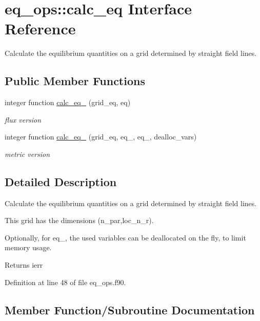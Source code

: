 \hypertarget{interfaceeq__ops_1_1calc__eq}{}\section{eq\+\_\+ops\+:\+:calc\+\_\+eq Interface Reference}
\label{interfaceeq__ops_1_1calc__eq}


Calculate the equilibrium quantities on a grid determined by straight field lines.  


\subsection*{Public Member Functions}
\begin{DoxyCompactItemize}
\item 
integer function \hyperlink{interfaceeq__ops_1_1calc__eq_a8587be1881a2238df0ea9216aaf93555}{calc\+\_\+eq\+\_} (grid\+\_\+eq, eq)
\begin{DoxyCompactList}\small\item\em flux version \end{DoxyCompactList}\item 
integer function \hyperlink{interfaceeq__ops_1_1calc__eq_ae2f56ab19ce5c33e863f32e1c9263604}{calc\+\_\+eq\+\_} (grid\+\_\+eq, eq\+\_, eq\+\_, dealloc\+\_\+vars)
\begin{DoxyCompactList}\small\item\em metric version \end{DoxyCompactList}\end{DoxyCompactItemize}


\subsection{Detailed Description}
Calculate the equilibrium quantities on a grid determined by straight field lines. 

This grid has the dimensions {\ttfamily }(n\+\_\+par,loc\+\_\+n\+\_\+r).

Optionally, for {\ttfamily eq\+\_}, the used variables can be deallocated on the fly, to limit memory usage.

\begin{DoxyReturn}{Returns}
ierr 
\end{DoxyReturn}


Definition at line 48 of file eq\+\_\+ops.\+f90.



\subsection{Member Function/\+Subroutine Documentation}
\mbox{\label{interfaceeq__ops_1_1calc__eq_a8587be1881a2238df0ea9216aaf93555}} 
